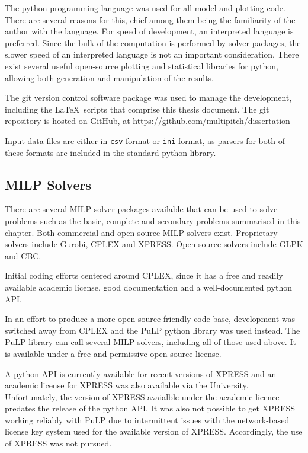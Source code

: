 The python programming language was used for all model and plotting code.
There are several reasons for this, chief among them being the familiarity of
the author with the language.
For speed of development, an interpreted language is preferred.
Since the bulk of the computation is performed by solver packages, the slower
speed of an interpreted language is not an important consideration.
There exist several useful open-source plotting and statistical libraries for
python, allowing both generation and manipulation of the results.

The git version control software package was used to manage the development,
including the \LaTeX\ scripts that comprise this thesis document.
The git repository is hosted on GitHub, at 
\url{https://github.com/multipitch/dissertation}

Input data files are either in \texttt{csv} format or \texttt{ini} format, as
parsers for both of these formats are included in the standard python library.

\subsection{MILP Solvers}\label{SS.impl1}
There are several MILP solver packages available that can be used to solve
problems such as the basic, complete and secondary problems summarised in this
chapter. Both commercial and open-source MILP solvers exist.
Proprietary solvers include Gurobi, CPLEX and XPRESS. Open source solvers
include GLPK and CBC.

Initial coding efforts centered around CPLEX, since it has a free and
readily available academic license, good documentation and a well-documented
python API.

In an effort to produce a more open-source-friendly code base, development was
switched away from CPLEX and the PuLP python library was used instead.
The PuLP library can call several MILP solvers, including all of those used
above.
It is available under a free and permissive open source license.

A python API is currently available for recent versions of XPRESS and an
academic license for XPRESS was also available via the University.
Unfortunately, the version of XPRESS avaialble under the academic licence
predates the release of the python API.
It was also not possible to get XPRESS working reliably with PuLP due to
intermittent issues with the network-based license key system used for the
available version of XPRESS.
Accordingly, the use of XPRESS was not pursued.

